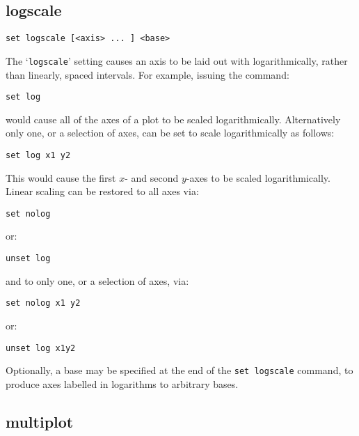 \documentclass[a4paper,onecolumn,11pt]{book}
\begin{document}
\subsection{logscale}

\begin{verbatim}
set logscale [<axis> ... ] <base>
\end{verbatim}

The `{\tt logscale}' setting causes an axis to be laid out with logarithmically,
rather than linearly, spaced intervals.  For example, issuing the command:

\begin{verbatim}
set log
\end{verbatim}

\noindent would cause all of the axes of a plot to be scaled logarithmically. Alternatively
only one, or a selection of axes, can be set to scale logarithmically as
follows:

\begin{verbatim}
set log x1 y2
\end{verbatim}

This would cause the first $x$- and second $y$-axes to be scaled logarithmically.
Linear scaling can be restored to all axes via:

\begin{verbatim}
set nolog
\end{verbatim}

\noindent or:

\begin{verbatim}
unset log
\end{verbatim}

\noindent and to only one, or a selection of axes, via:

\begin{verbatim}
set nolog x1 y2
\end{verbatim}

\noindent or:

\begin{verbatim}
unset log x1y2
\end{verbatim}

Optionally, a base may be specified at the end of the {\tt set logscale}
command, to produce axes labelled in logarithms to arbitrary bases.

\subsection{multiplot}
\end{document}
